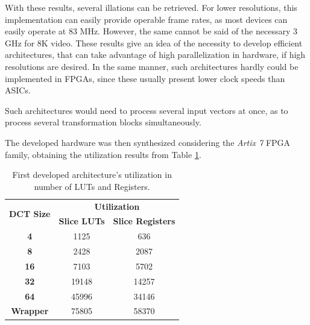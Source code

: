 With these results, several illations can be retrieved. For lower resolutions, this implementation can easily provide operable frame rates, as most devices can easily operate at 83 MHz. However, the same cannot be said of the necessary 3 GHz for 8K video. These results give an idea of the necessity to develop efficient architectures, that can take advantage of high parallelization in hardware, if high resolutions are desired. In the same manner, such architectures hardly could be implemented in FPGAs, since these usually present lower clock speeds than ASICs.

Such architectures would need to process several input vectors at once, as to process several transformation blocks simultaneously.

The developed hardware was then synthesized considering the \emph{Artix 7} FPGA family, obtaining the utilization results from Table \ref{tab:v1results}.

\begin{table}[!htpb]
    \centering
    \caption{First developed architecture's utilization in number of LUTs and Registers.}
    \begin{tabular}{ccc} \toprule
        \multirow{2}{*}{\textbf{DCT Size}} &     \multicolumn{2}{c}{\textbf{Utilization}} \\
         &      \textbf{Slice LUTs} &      \textbf{Slice Registers} \\ \toprule
        \textbf{4} &    1125  &       636  \\ \hline
        \textbf{8} &    2428  &       2087  \\ \hline
        \textbf{16} &   7103  &      5702  \\ \hline
        \textbf{32} &   19148  &     14257  \\ \hline
        \textbf{64} &   45996  &    34146  \\ \bottomrule        
        \textbf{Wrapper} & 75805  & 58370  \\
        \bottomrule
    \end{tabular}    
    \label{tab:v1results}
\end{table}


